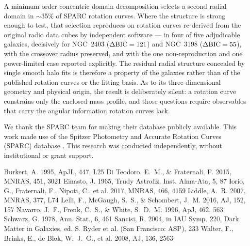 \documentclass[twocolumn]{aastex701}
\newcommand{\dbic}{\Delta{\rm BIC}}
\begin{document}
A minimum-order concentric-domain decomposition selects a second radial domain in
$\sim$35\% of SPARC rotation curves. Where the structure is strong enough to test,
that selection reproduces on rotation curves re-derived from the original radio
data cubes by independent software --- in four of five adjudicable galaxies,
decisively for NGC~2403 ($\dbic = 121$) and NGC~3198 ($\dbic = 55$), with the
crossover radius preserved, and with the one non-reproduction and one
power-limited case reported explicitly. The residual radial structure concealed by
single smooth halo fits is therefore a property of the galaxies rather than of the
published rotation curves or the fitting basis. As to its three-dimensional
geometry and physical origin, the result is deliberately silent: a rotation curve
constrains only the enclosed-mass profile, and those questions require observables
that carry the angular information rotation curves lack.

\begin{acknowledgments}
We thank the SPARC team for making their database publicly available. This work
made use of the Spitzer Photometry and Accurate Rotation Curves (SPARC) database
\citep{Lelli2016}. This research was conducted independently, without
institutional or grant support.
\end{acknowledgments}


\begin{thebibliography}{}
 Burkert, A. 1995, ApJL, 447, L25
 Di Teodoro, E.~M., \& Fraternali, F. 2015, MNRAS, 451, 3021
 Einasto, J. 1965, Trudy Astrofiz. Inst. Alma-Ata, 5, 87
 Iorio, G., Fraternali, F., Nipoti, C., et al. 2017, MNRAS, 466, 4159
 Liddle, A.~R. 2007, MNRAS, 377, L74
 Lelli, F., McGaugh, S.~S., \& Schombert, J.~M. 2016, AJ, 152, 157
 Navarro, J.~F., Frenk, C.~S., \& White, S.~D.~M. 1996, ApJ, 462, 563
 Schwarz, G. 1978, Ann. Stat., 6, 461
 Sancisi, R. 2004, in IAU Symp. 220, Dark Matter in Galaxies, ed. S. Ryder et al. (San Francisco: ASP), 233
 Walter, F., Brinks, E., de Blok, W.~J.~G., et al. 2008, AJ, 136, 2563
\end{thebibliography}
\end{document}
